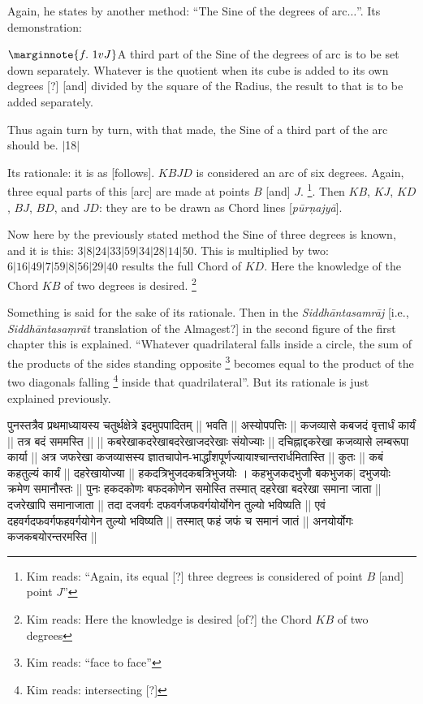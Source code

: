 \documentclass[12pt]{book}
\let\*=\d
\def\purnajya{\textit{p\=ur\*najy\=a}}
\def\elp{$\ldots$}
\def\danda{$|$}
\begin{document}
\newpage


Again, he states by another method: ``The Sine of the degrees of arc\elp''. Its demonstration:

$\marginnote{f.~1v J}$A third part of the Sine of the degrees of arc is to be set down separately. Whatever
is the quotient when its cube
is added to its own degrees [?] [and] divided by the square of the Radius, the result
to  that is to be added separately. 

Thus again turn by turn, with that made, the Sine of a third part of the arc should be. \danda18\danda

Its rationale: it is as [follows]. $KBJD$ is considered an arc of six degrees. 
Again, three equal parts of this [arc] are made at points $B$ [and] $J$. \footnote{Kim reads: ``Again, its equal [?] three degrees is considered of point $B$ [and] point $J$''}.
Then $KB$, $KJ$, $KD$, $BJ$, $BD$, and $JD$: they are to be drawn as
Chord lines [\purnajya]. 

Now here by the previously stated method the Sine of three degrees is known, 
and it is this:  $3|8|24|33|59|34|28|14|50$. This is multiplied by two:
$6|16|49|7|59|8|56|29|40$ results the full Chord of $KD$. Here the knowledge
of the Chord $KB$ of two degrees is desired. \footnote{Kim reads: Here the knowledge is desired [of?] the Chord $KB$ of two degrees}

Something is said for the sake of its rationale. Then  in the 
\textit{Siddh\=anta\-samr\=aj} [i.e., \textit{Siddh\=antasa\*mr\=at} translation
of the Almagest?] in the second figure of the first chapter this is
explained.  ``Whatever quadrilateral falls inside a circle, the sum of the 
products of the sides standing opposite \footnote{Kim reads: ``face to face''} becomes equal to the
product of the two diagonals falling \footnote{Kim reads: intersecting [?]} inside that quadrilateral''.
But its rationale is just explained previously. 

\newpage 


{\s पुनस्तत्रैव प्रथ\-माध्यायस्य चतुर्थक्षेत्रे इदमुपपादितम् ||
%
{
} 
 भवति ||
अस्योपपत्तिः ||
कजव्यासे कबजदं वृत्तार्धं कार्यं ||
तत्र बदं 
सममस्ति || ||
कबरेखाकदरेखा\-बदरेखा\-जदरेखाः संयोज्याः ||
दचिह्नाद्दकरेखा कजव्यासे लम्बरूपा कार्या ||
अत्र जफरेखा कजव्यासस्य ज्ञातचापोन-भार्द्धांशपूर्णज्यायाश्चान्तरार्धमितास्ति ||
कुतः ||
कबं कहतुल्यं कार्यं ||
दहरेखायोज्या ||
हकदत्रिभुज\-दकबत्रिभुजयोः ।
कहभुजकदभुजौ बकभुजक$|$%
दभुजयोः
क्रमेण समानौस्तः || पुनः हकदकोणः बफदकोणेन समोस्ति तस्मात् दहरेखा बदरेखा समाना जाता || दजरेखापि समानाजाता || तदा दजवर्गः दफवर्गजफवर्गयोर्योगेन तुल्यो भविष्यति ||
एवं दहवर्गदफवर्गफहवर्गयोगेन तुल्यो भविष्यति ||
तस्मात् फहं जफं च समानं जातं || अनयोर्योगः कजकबयोरन्तरमस्ति ||} \\
\end{document}
